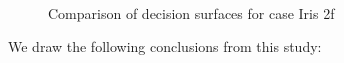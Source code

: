 %
\begin{figure}
\caption{Comparison of decision surfaces for case Iris 2f}
\label{fig_comparison_decision_iris_2f}
%
\begin{center}
\\
\end{center}
\end{figure}
%
We draw the following conclusions from this study:
%
